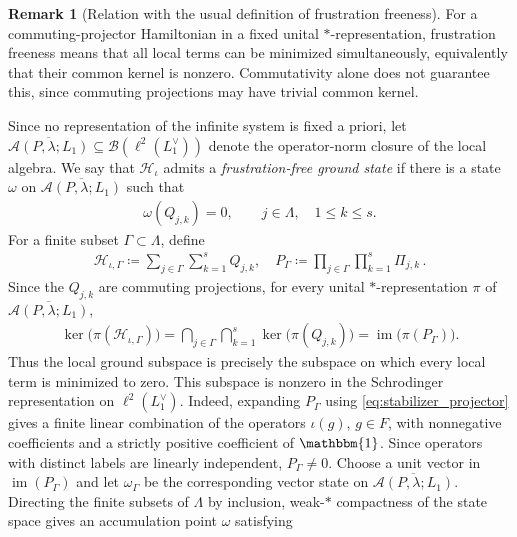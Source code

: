\documentclass[sn-mathphys-num]{sn-jnl}
\theoremstyle{definition}
\newtheorem{remark}[lemma]{Remark}
\numberwithin{equation}{section}
\theoremstyle{definition}
\def\CA{{\mathcal A}}
\def\CH {{\mathcal H}}
\def\La{{\Lambda}}
\def\l{{\lambda}}
\def\ker{\operatorname{ker}}
\newcommand{\id}{\mathbbm{1}}
\begin{document}
\begin{remark}[Relation with the usual definition of frustration freeness]
\label{remark:usual_frustr_freeness}
For a commuting-projector Hamiltonian in a fixed unital
$*$-representation, frustration freeness means that all local terms can be
minimized simultaneously, equivalently that their common kernel is nonzero.
Commutativity alone does not guarantee this, since commuting projections may
have trivial common kernel.

Since no representation of the infinite system is fixed a priori, let
$\overline{\CA(P,\l;L_1)}
\subseteq\mathcal B(\ell^2(L_1^\vee))$ denote the operator-norm closure of
the local algebra. We say that $\CH_\iota$ admits a
\textit{frustration-free ground state} if there is a state $\omega$ on
$\overline{\CA(P,\l;L_1)}$ such that
\begin{align}\label{eq:frustration_free_state}
    \omega(Q_{j,k})=0,
    \qquad j\in\La,
    \quad 1\leqslant k\leqslant s.
\end{align}
For a finite subset $\Gamma\subset\La$, define
\begin{align}
    \CH_{\iota,\Gamma}\coloneqq
    \sum_{j\in\Gamma}\sum_{k=1}^{s}Q_{j,k},
 \quad 
    P_{\Gamma}
    \coloneqq
    \prod_{j\in\Gamma}\prod_{k=1}^{s}\Pi_{j,k}\,.
\end{align}
Since the $Q_{j,k}$ are commuting projections, for every unital
$*$-representation $\pi$ of $\overline{\CA(P,\l;L_1)}$,
\begin{align}\label{eq:local_ground_subspace}
    \ker\bigl(\pi(\CH_{\iota,\Gamma})\bigr)
    =
    \bigcap_{j\in\Gamma}\bigcap_{k=1}^{s}
    \ker\bigl(\pi(Q_{j,k})\bigr)
    =\operatorname{im}\bigl(\pi(P_{\Gamma})\bigr).
\end{align}
Thus the local ground subspace is precisely the subspace on which every
local term is minimized to zero. This subspace is nonzero in the Schrodinger representation on
$\ell^2(L_1^{\vee})$. Indeed, expanding $P_{\Gamma}$ using
\eqref{eq:stabilizer_projector} gives a finite linear combination of the
operators $\iota(g)$, $g\in F$, with nonnegative coefficients and a strictly
positive coefficient of $\id$. Since operators with distinct labels are
linearly independent, $P_{\Gamma}\neq0$. Choose a unit vector in
$\operatorname{im}(P_{\Gamma})$ and let $\omega_{\Gamma}$ be the corresponding
vector state on $\overline{\CA(P,\l;L_1)}$. Directing the finite subsets of $\La$ by
inclusion, weak-$*$ compactness of the state space gives an accumulation
point $\omega$ satisfying
\begin{align}

\end{align}
\end{remark}
\end{document}
